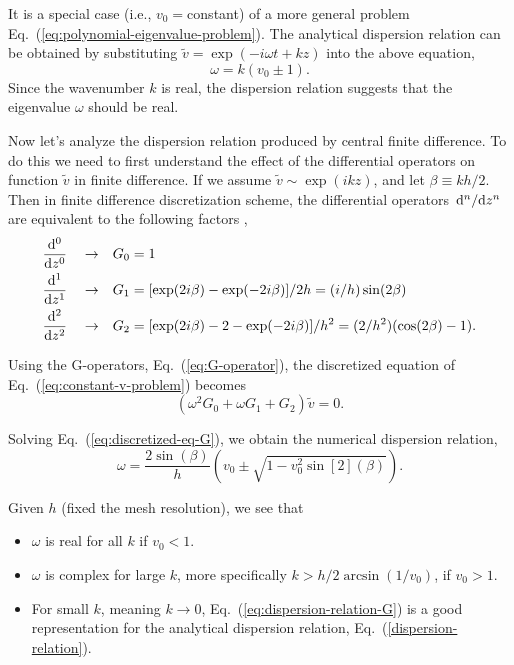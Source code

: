 It is a special case (i.e., $v_0=$constant) of a more general problem Eq.~(\ref{eq:polynomial-eigenvalue-problem}). The analytical dispersion relation can be obtained by substituting $\tilde{v} = \exp(-i\omega t + kz)$ into the above equation,
\begin{equation} \label{dispersion-relation}
	\omega = k(v_0 \pm 1).
\end{equation}
Since the wavenumber $k$ is real, the dispersion relation suggests that the eigenvalue $\omega$ should be real.

Now let's analyze the dispersion relation produced by central finite difference. To do this we need to first understand the effect of the differential operators on function $\tilde{v}$ in finite difference. If we assume $\tilde{v}\sim \exp(ikz)$, and let $\beta\equiv kh/2$. Then in finite difference discretization scheme, the differential operators $\dv*[n]{z}$ are equivalent to the following factors \cite{llobet_spectral_1990},
\begin{equation}
	\begin{aligned}
		\dv[0]{z} \quad \to \quad & G_0 = 1                                                               \\
		\dv[1]{z} \quad \to \quad & G_1 = [\exp(2i\beta)-\exp(-2i\beta)]/2h = (i/h)\sin(2\beta)           \\
		\dv[2]{z} \quad \to \quad & G_2 = [\exp(2i\beta)-2-\exp(-2i\beta)]/h^2 = (2/h^2)(\cos(2\beta)-1).
	\end{aligned}
	\label{eq:G-operator}
\end{equation}

Using the G-operators, Eq.~(\ref{eq:G-operator}), the discretized equation of Eq.~(\ref{eq:constant-v-problem}) becomes
\begin{equation} \label{eq:discretized-eq-G}
	(\omega^2G_0 + \omega G_1 + G_2)\tilde{v} = 0.
\end{equation}

Solving Eq.~(\ref{eq:discretized-eq-G}), we obtain the numerical dispersion relation,
\begin{equation}
	\omega = \frac{2\sin(\beta)}{h}\left(v_0 \pm \sqrt{1 - v_0^2\sin[2](\beta)}\right).
	\label{eq:dispersion-relation-G}
\end{equation}

Given $h$ (fixed the mesh resolution), we see that
\begin{itemize}
	\item $\omega$ is real for all $k$ if $v_0 < 1$.
	\item $\omega$ is complex for large $k$, more specifically $k>h/2\arcsin(1/v_0)$, if $v_0 > 1$.
	\item For small $k$, meaning $k\to 0$, Eq.~(\ref{eq:dispersion-relation-G}) is a good representation for the analytical dispersion relation, Eq.~(\ref{dispersion-relation}).
\end{itemize}

